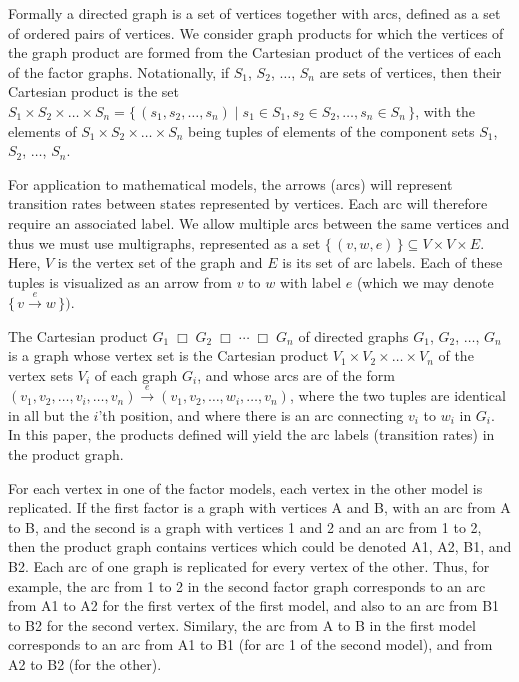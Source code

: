 \documentclass[review]{elsarticle}
\newcommand{\cartprod}{\;\Box\;}
\begin{document}
Formally a directed graph is a set of vertices together with
arcs, defined as a set of ordered pairs of vertices.  We consider
graph products for which the vertices of the graph product are
formed from the Cartesian product of the vertices of each
of the factor graphs.  Notationally, if
$S_1$, $S_2$, $\ldots$, $S_n$ are sets of vertices, then their
Cartesian product is the set
$S_1\times S_2\times\ldots\times S_n = \{\,(s_1,s_2,\ldots,s_n)\mid s_1\in S_1, s_2\in S_2,\ldots, s_n\in S_n\,\}$,
with the elements of $S_1\times S_2\times\ldots\times S_n$ being
tuples of elements of the component sets $S_1$, $S_2$, $\ldots$, $S_n$.

For application to mathematical models, the arrows (arcs) will
represent transition rates between states represented by vertices.  Each
arc will therefore require an associated label.  
We allow multiple arcs between the same vertices and thus
we must use multigraphs,
represented
as a set $\{\,(v,w,e)\,\}\subseteq V\times V\times E$. Here,
$V$ is the vertex set of the graph and $E$ is its set of arc
labels.  Each of these tuples is visualized as an arrow from $v$ to
$w$ with label $e$ (which we may denote
$\{\,v\xrightarrow{e} w\,\})$.

The Cartesian product
$G_1\cartprod G_2\cartprod\cdots\cartprod G_n$
of directed graphs
$G_1$, $G_2$, $\ldots$, $G_n$ is a graph whose vertex
set is the Cartesian product $V_1\times V_2\times\ldots\times V_n$
of the vertex sets $V_i$ of each graph $G_i$, and whose arcs
are of the form
$(v_1,v_2,\ldots,v_i,\ldots,v_n)\xrightarrow{e} (v_1,v_2,\ldots,w_i,\ldots,v_n)$,
where the two tuples are identical in all but the $i$'th position,
and where there is an arc connecting $v_i$ to $w_i$ in $G_i$.
In this paper, the products defined will yield the arc 
labels (transition rates) in the product graph.  

For each
vertex in one of the factor models, each vertex in the other model
is replicated.  
If the first factor is a graph with vertices A and B, with an arc from A 
to B, and the second is a graph with vertices 1 and 2 and an arc from 1 to 2, then the
product graph contains vertices which could be denoted A1, A2, B1, and B2.  Each arc
of one graph is replicated for every vertex of the other.  Thus, for example, 
the arc from 1 to 2 in the second factor graph corresponds to an arc from A1 to A2 for
the first vertex of the first model, and also to an arc from B1 to B2 for the second vertex.
Similary, the arc from A to B in the first model corresponds to an arc from A1 to B1 (for arc 1
of the second model), and from A2 to B2 (for the other).
\end{document}
